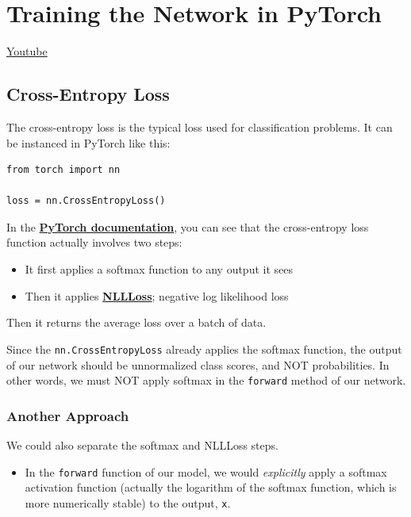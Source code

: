 \section{Training the Network in PyTorch}
\href{https://www.youtube.com/watch?v=PYuAGhxz1Mg&ab_channel=Udacity}{Youtube}
\subsection{Cross-Entropy Loss}

The cross-entropy loss is the typical loss used for classification problems. It can be instanced in PyTorch like this:
\begin{lstlisting}
from torch import nn

loss = nn.CrossEntropyLoss()
\end{lstlisting}
In the \href{https://pytorch.org/docs/stable/}{\textbf{PyTorch documentation}}, you can see that the cross-entropy loss function actually involves two steps:

\begin{itemize}
    \item It first applies a softmax function to any output it sees
    \item Then it applies \href{https://pytorch.org/docs/stable/nn.html\#nllloss}{\textbf{NLLLoss}}; negative log likelihood loss
\end{itemize}
Then it returns the average loss over a batch of data.

Since the \verb|nn.CrossEntropyLoss| already applies the softmax function, the output of our network should be unnormalized class scores, and NOT probabilities. In other words, we must NOT apply softmax in the \verb|forward| method of our network.

\subsubsection{Another Approach}

We could also separate the softmax and NLLLoss steps.\newline

\begin{itemize}
    \item In the \verb|forward| function of our model, we would \textit{explicitly} apply a softmax activation function (actually the logarithm of the softmax function, which is more numerically stable) to the output, \verb|x|.
\end{itemize}

